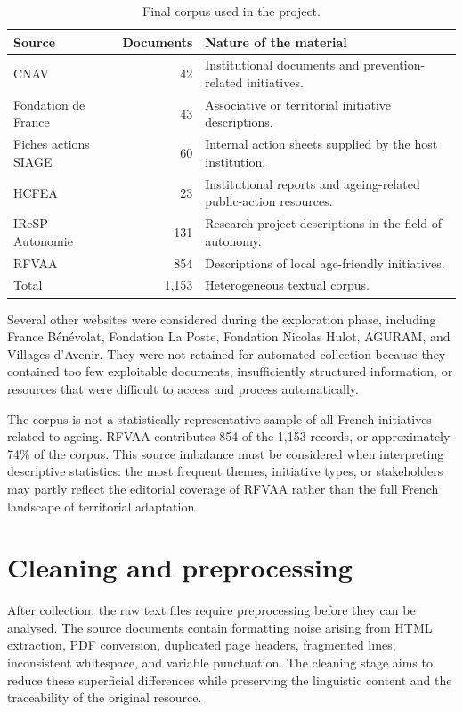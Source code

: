 \begin{table}[H]
\centering
\begin{tabular}{lrp{7cm}}
\toprule
Source & Documents & Nature of the material \\
\midrule
CNAV & 42 & Institutional documents and prevention-related initiatives. \\
Fondation de France & 43 & Associative or territorial initiative descriptions. \\
Fiches actions SIAGE & 60 & Internal action sheets supplied by the host institution. \\
HCFEA & 23 & Institutional reports and ageing-related public-action resources. \\
IReSP Autonomie & 131 & Research-project descriptions in the field of autonomy. \\
RFVAA & 854 & Descriptions of local age-friendly initiatives. \\
\midrule
Total & 1,153 & Heterogeneous textual corpus. \\
\bottomrule
\end{tabular}
\caption{Final corpus used in the project.}
\label{tab:final-corpus}
\end{table}

Several other websites were considered during the exploration phase, including
France Bénévolat, Fondation La Poste, Fondation Nicolas Hulot, AGURAM, and
Villages d'Avenir. They were not retained for automated collection because they
contained too few exploitable documents, insufficiently structured information,
or resources that were difficult to access and process automatically.

The corpus is not a statistically representative sample of all French
initiatives related to ageing. RFVAA contributes 854 of the 1,153 records, or
approximately 74\% of the corpus. This source imbalance must be considered when
interpreting descriptive statistics: the most frequent themes, initiative types,
or stakeholders may partly reflect the editorial coverage of RFVAA rather than
the full French landscape of territorial adaptation.

\section{Cleaning and preprocessing}

After collection, the raw text files require preprocessing before they can be
analysed. The source documents contain formatting noise arising from HTML
extraction, PDF conversion, duplicated page headers, fragmented lines,
inconsistent whitespace, and variable punctuation. The cleaning stage aims to
reduce these superficial differences while preserving the linguistic content and
the traceability of the original resource.

